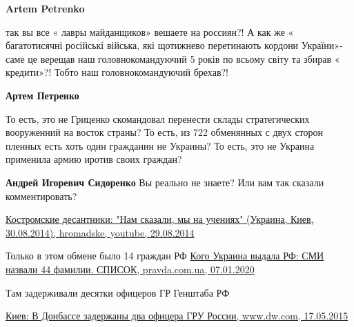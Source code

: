 \begin{itemize}
\begin{itemize}
\textbf{Artem Petrenko} 

так вы все « лавры майданщиков» вешаете на россиян?! А как же « багатотисячні
російські війська, які щотижнево перетинають кордони України»- саме це верещав
наш головнокомандуючий 5 років по всьому світу та збирав « кредити»?! Тобто наш
головнокомандуючий брехав?!

 
\textbf{Артем Петренко} 

То есть, это не Гриценко скомандовал перенести склады стратегических
вооруженний на восток страны? То есть, из 722 обменянных с двух сторон пленных
есть хоть один гражданин не Украины? То есть, это не Украина применила армию
иротив своих граждан?

 
\textbf{Андрей Игоревич Сидоренко} Вы реально не знаете? Или вам так сказали комментировать?

\href{https://www.youtube.com/watch?v=-CYvm-HnSpg}{%
Костромские десантники: "Нам сказали, мы на учениях" (Украина, Киев, 30.08.2014), hromadske, youtube, 29.08.2014%
}

 
Только в этом обмене было 14 граждан РФ
\href{https://www.pravda.com.ua/rus/news/2020/01/7/7236746/}{%
Кого Украина выдала РФ: СМИ назвали 44 фамилии. СПИСОК, pravda.com.ua, 07.01.2020%
}

 
Там задерживали десятки офицеров ГР Генштаба РФ

\href{https://www.dw.com/ru/киев-в-донбассе-задержаны-два-офицера-гру-россии/a-18455451}{%
Киев: В Донбассе задержаны два офицера ГРУ России, www.dw.com, 17.05.2015%
}


\end{itemize}
\end{itemize}
